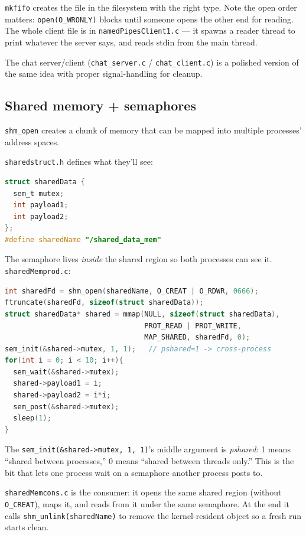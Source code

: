 \documentclass[11pt]{article}
\begin{document}
\texttt{mkfifo} creates the file in the filesystem with the right
type. Note the open order matters: \texttt{open(O\_WRONLY)} blocks
until someone opens the other end for reading. The whole client
file is in \texttt{namedPipesClient1.c} --- it spawns a reader
thread to print whatever the server says, and reads stdin from the
main thread.

The chat server/client (\texttt{chat\_server.c} /
\texttt{chat\_client.c}) is a polished version of the same idea
with proper signal-handling for cleanup.

\subsection*{Shared memory + semaphores}

\texttt{shm\_open} creates a chunk of memory that can be mapped
into multiple processes' address spaces.

\texttt{sharedstruct.h} defines what they'll see:

\begin{lstlisting}[language=C]
struct sharedData {
  sem_t mutex;
  int payload1;
  int payload2;
};
#define sharedName "/shared_data_mem"
\end{lstlisting}

The semaphore lives \emph{inside} the shared region so both
processes can see it. \texttt{sharedMemprod.c}:

\begin{lstlisting}[language=C]
int sharedFd = shm_open(sharedName, O_CREAT | O_RDWR, 0666);
ftruncate(sharedFd, sizeof(struct sharedData));
struct sharedData* shared = mmap(NULL, sizeof(struct sharedData),
                                 PROT_READ | PROT_WRITE,
                                 MAP_SHARED, sharedFd, 0);
sem_init(&shared->mutex, 1, 1);   // pshared=1 -> cross-process
for(int i = 0; i < 10; i++){
  sem_wait(&shared->mutex);
  shared->payload1 = i;
  shared->payload2 = i*i;
  sem_post(&shared->mutex);
  sleep(1);
}
\end{lstlisting}

The \texttt{sem\_init(\&shared->mutex, 1, 1)}'s middle argument is
\emph{pshared}: 1 means ``shared between processes,'' 0 means
``shared between threads only.'' This is the bit that lets one
process wait on a semaphore another process posts to.

\texttt{sharedMemcons.c} is the consumer: it opens the same shared
region (without \texttt{O\_CREAT}), maps it, and reads from it
under the same semaphore. At the end it calls
\texttt{shm\_unlink(sharedName)} to remove the kernel-resident
object so a fresh run starts clean.
\end{document}
